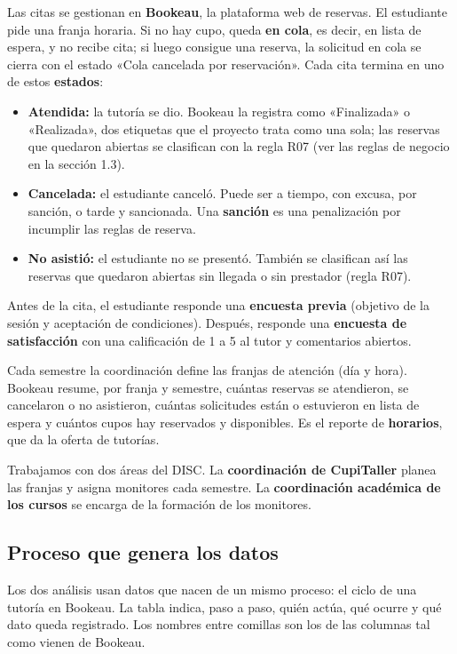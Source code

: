 \documentclass[11pt,letterpaper]{article}
\begin{document}
Las citas se gestionan en \textbf{Bookeau}, la plataforma web de reservas. El estudiante pide una franja horaria. Si no hay cupo, queda \textbf{en cola}, es decir, en lista de espera, y no recibe cita; si luego consigue una reserva, la solicitud en cola se cierra con el estado «Cola cancelada por reservación». Cada cita termina en uno de estos \textbf{estados}:

\begin{itemize}[leftmargin=1.5em,itemsep=2pt]
\item \textbf{Atendida:} la tutoría se dio. Bookeau la registra como «Finalizada» o «Realizada», dos etiquetas que el proyecto trata como una sola; las reservas que quedaron abiertas se clasifican con la regla R07 (ver las reglas de negocio en la sección 1.3).
\item \textbf{Cancelada:} el estudiante canceló. Puede ser a tiempo, con excusa, por sanción, o tarde y sancionada. Una \textbf{sanción} es una penalización por incumplir las reglas de reserva.
\item \textbf{No asistió:} el estudiante no se presentó. También se clasifican así las reservas que quedaron abiertas sin llegada o sin prestador (regla R07).
\end{itemize}

Antes de la cita, el estudiante responde una \textbf{encuesta previa} (objetivo de la sesión y aceptación de condiciones). Después, responde una \textbf{encuesta de satisfacción} con una calificación de 1 a 5 al tutor y comentarios abiertos.

Cada semestre la coordinación define las franjas de atención (día y hora). Bookeau resume, por franja y semestre, cuántas reservas se atendieron, se cancelaron o no asistieron, cuántas solicitudes están o estuvieron en lista de espera y cuántos cupos hay reservados y disponibles. Es el reporte de \textbf{horarios}, que da la oferta de tutorías.

Trabajamos con dos áreas del DISC. La \textbf{coordinación de CupiTaller} planea las franjas y asigna monitores cada semestre. La \textbf{coordinación académica de los cursos} se encarga de la formación de los monitores.

\subsection{Proceso que genera los datos}

Los dos análisis usan datos que nacen de un mismo proceso: el ciclo de una tutoría en Bookeau. La tabla indica, paso a paso, quién actúa, qué ocurre y qué dato queda registrado. Los nombres entre comillas son los de las columnas tal como vienen de Bookeau.
\end{document}

